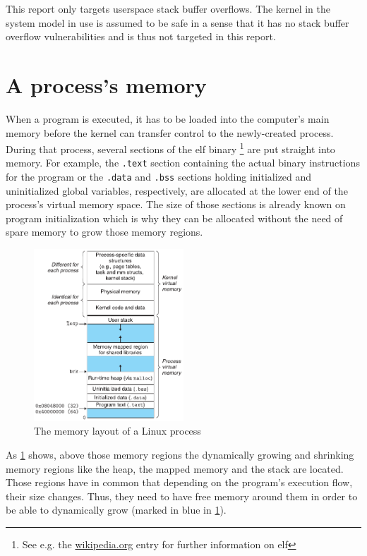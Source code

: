 This report only targets userspace stack buffer overflows.
The kernel in the system model in use is assumed to be safe in a sense that it has no stack buffer overflow vulnerabilities and is thus not targeted in this report.

\section{A process's memory}
\label{sec:process-memory}

When a program is executed, it has to be loaded into the computer's main memory before the kernel can transfer control to the newly-created process.
During that process, several sections of the \gls{elf} binary%
	\footnote{See e.g. the \href{https://en.wikipedia.org/wiki/Executable_and_Linkable_Format}{wikipedia.org} entry for further information on \gls{elf}}
are put straight into memory.
For example, the \texttt{.text} section containing the actual binary instructions for the program or the \texttt{.data} and \texttt{.bss} sections holding initialized and uninitialized global variables, respectively, are allocated at the lower end of the process's virtual memory space.
The size of those sections is already known on program initialization which is why they can be allocated without the need of spare memory to grow those memory regions.

\begin{figure}[htb]
	\centering
	\includegraphics[width=0.5\textwidth]{figures/memory-layout}
	\caption{The memory layout of a Linux process \cite[804]{Bryant2011}}
	\label{fig:memory-layout}
\end{figure}

As \cref{fig:memory-layout} shows, above those memory regions the dynamically growing and shrinking memory regions like the heap, the mapped memory and the stack are located.
Those regions have in common that depending on the program's execution flow, their size changes.
Thus, they need to have free memory around them in order to be able to dynamically grow (marked in blue in \cref{fig:memory-layout}).

